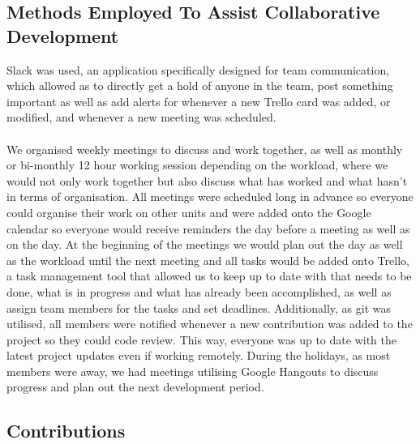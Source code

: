 \documentclass[11pt,a4paper]{article}
\begin{document}
        \subsection{Methods Employed To Assist Collaborative Development}
        Slack was used, an application specifically designed for team communication, which allowed as to directly get a hold of anyone in the team, post something important as well as add alerts for whenever a new Trello card was added, or modified, and whenever a new meeting was scheduled. \\ \\
        We organised weekly meetings to discuss and work together, as well as monthly or bi-monthly 12 hour working session depending on the workload, where we would not only work together but also discuss what has worked and what hasn’t in terms of organisation. All meetings were scheduled long in advance so everyone could organise their work on other units and were added onto the Google calendar so everyone would receive reminders the day before a meeting as well as on the day.
        At the beginning of the meetings we would plan out the day as well as the workload until the next meeting and all tasks would be added onto Trello, a task management tool that allowed us to keep up to date with that needs to be done, what is in progress and what has already been accomplished, as well as assign team members for the tasks and set deadlines.
        Additionally, as git was utilised, all members were notified whenever a new contribution was added to the project so they could code review. This way, everyone was up to date with the latest project updates even if working remotely. 
        During the holidays, as most members were away, we had meetings utilising Google Hangouts to discuss progress and plan out the next development period. 

        \pagebreak

        \subsection{Contributions}
\end{document}
